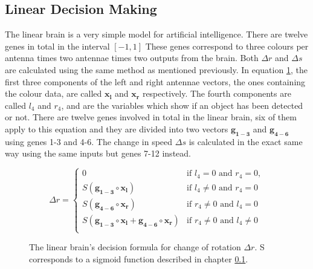 \documentclass[a4paper,11pt]{kth-mag}
\begin{document}
\subsection{Linear Decision Making}
\label{linear-decision-making}
The linear brain is a very simple model for artificial intelligence. There are twelve genes in total in the interval $[-1,1]$ These genes correspond to three colours per antenna times two antennae times two outputs from the brain. Both $\Delta r$ and $\Delta s$ are calculated using the same method as mentioned previously.
In equation \ref{linear-decide}, the first three components of the left and right antennae vectors, the ones containing the colour data, are called $\mathbf{x_{l}}$ and $\mathbf{x_{r}}$ respectively. The fourth components are called $l_4$ and $r_4$, and are the variables which show if an object has been detected or not. There are twelve genes involved in total in the linear brain, six of them apply to this equation and they are divided into two vectors $\mathbf{g_{1-3}}$ and $\mathbf{g_{4-6}}$ using genes 1-3 and 4-6. The change in speed $\Delta s$ is calculated in the exact same way using the same inputs but genes 7-12 instead.

\begin{figure}
\begin{equation}
\Delta r =
\begin{cases}
	0 																				& \text{if $l_4 = 0$ and $r_4 = 0$},\\
	S(\mathbf{g_{1-3}} \circ \mathbf{x_l}) 											& \text{if $l_4 \neq 0$ and $r_4 = 0$}\\
	S(\mathbf{g_{4-6}} \circ \mathbf{x_r}) 											& \text{if $r_4 \neq 0$ and $l_4 = 0$}\\
	S(\mathbf{g_{1-3}} \circ \mathbf{x_l} + \mathbf{g_{4-6}} \circ \mathbf{x_r} ) 	& \text{if $r_4 \neq 0$ and $l_4 \neq 0$}\\
\end{cases}	
\end{equation}
\caption{The linear brain's decision formula for change of rotation $\Delta r$. S corresponds to a sigmoid function described in chapter \ref{linear-decision-making}.}
\label{linear-decide}
\end{figure}
\end{document}
